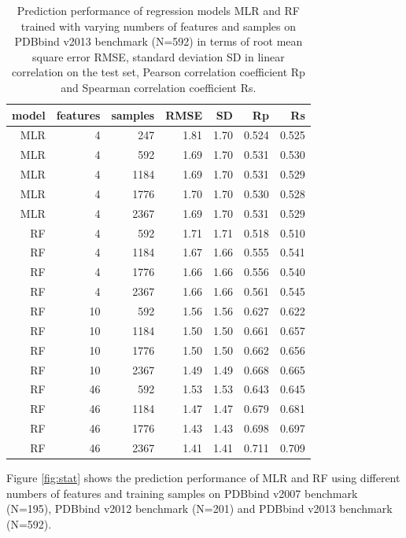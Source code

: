 \documentclass[journal=jacsat,manuscript=article]{achemso}
\begin{document}
\begin{table}
\caption{Prediction performance of regression models MLR and RF trained with varying numbers of features and samples on PDBbind v2013 benchmark (N=592) in terms of root mean square error RMSE, standard deviation SD in linear correlation on the test set, Pearson correlation coefficient Rp and Spearman correlation coefficient Rs.}
\label{tbl:tst592}
\begin{tabular}{rrrrrrr}
\hline
model & features & samples & RMSE & SD & Rp & Rs\\
\hline
MLR &  4 &  247 & 1.81 & 1.70 & 0.524 & 0.525\\
MLR &  4 &  592 & 1.69 & 1.70 & 0.531 & 0.530\\
MLR &  4 & 1184 & 1.69 & 1.70 & 0.531 & 0.529\\
MLR &  4 & 1776 & 1.70 & 1.70 & 0.530 & 0.528\\
MLR &  4 & 2367 & 1.69 & 1.70 & 0.531 & 0.529\\
 RF &  4 &  592 & 1.71 & 1.71 & 0.518 & 0.510\\
 RF &  4 & 1184 & 1.67 & 1.66 & 0.555 & 0.541\\
 RF &  4 & 1776 & 1.66 & 1.66 & 0.556 & 0.540\\
 RF &  4 & 2367 & 1.66 & 1.66 & 0.561 & 0.545\\
 RF & 10 &  592 & 1.56 & 1.56 & 0.627 & 0.622\\
 RF & 10 & 1184 & 1.50 & 1.50 & 0.661 & 0.657\\
 RF & 10 & 1776 & 1.50 & 1.50 & 0.662 & 0.656\\
 RF & 10 & 2367 & 1.49 & 1.49 & 0.668 & 0.665\\
 RF & 46 &  592 & 1.53 & 1.53 & 0.643 & 0.645\\
 RF & 46 & 1184 & 1.47 & 1.47 & 0.679 & 0.681\\
 RF & 46 & 1776 & 1.43 & 1.43 & 0.698 & 0.697\\
 RF & 46 & 2367 & 1.41 & 1.41 & 0.711 & 0.709\\
\hline
\end{tabular}
\end{table}

Figure \ref{fig:stat} shows the prediction performance of MLR and RF using different numbers of features and training samples on PDBbind v2007 benchmark (N=195), PDBbind v2012 benchmark (N=201) and PDBbind v2013 benchmark (N=592).
\end{document}
